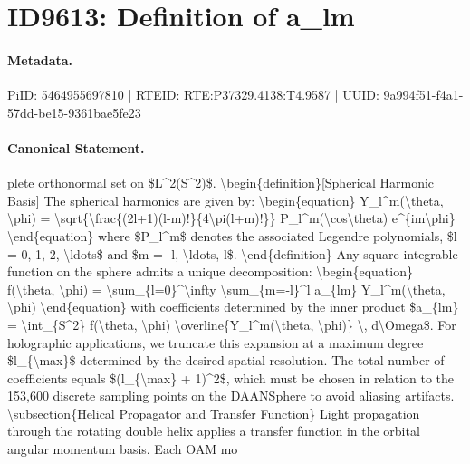 \section*{ID9613: Definition of a\_lm}
\paragraph{Metadata.}
PiID: 5464955697810 | RTEID: RTE:P37329.4138:T4.9587 | UUID: 9a994f51-f4a1-57dd-be15-9361bae5fe23

\paragraph{Canonical Statement.}
plete orthonormal set on \$L\textasciicircum{}2(S\textasciicircum{}2)\$. \textbackslash{}begin\{definition\}[Spherical Harmonic Basis] The spherical harmonics are given by: \textbackslash{}begin\{equation\} Y\_l\textasciicircum{}m(\textbackslash{}theta, \textbackslash{}phi) = \textbackslash{}sqrt\{\textbackslash{}frac\{(2l+1)(l-m)!\}\{4\textbackslash{}pi(l+m)!\}\} P\_l\textasciicircum{}m(\textbackslash{}cos\textbackslash{}theta) e\textasciicircum{}\{im\textbackslash{}phi\} \textbackslash{}end\{equation\} where \$P\_l\textasciicircum{}m\$ denotes the associated Legendre polynomials, \$l = 0, 1, 2, \textbackslash{}ldots\$ and \$m = -l, \textbackslash{}ldots, l\$. \textbackslash{}end\{definition\} Any square-integrable function on the sphere admits a unique decomposition: \textbackslash{}begin\{equation\} f(\textbackslash{}theta, \textbackslash{}phi) = \textbackslash{}sum\_\{l=0\}\textasciicircum{}\textbackslash{}infty \textbackslash{}sum\_\{m=-l\}\textasciicircum{}l a\_\{lm\} Y\_l\textasciicircum{}m(\textbackslash{}theta, \textbackslash{}phi) \textbackslash{}end\{equation\} with coefficients determined by the inner product \$a\_\{lm\} = \textbackslash{}int\_\{S\textasciicircum{}2\} f(\textbackslash{}theta, \textbackslash{}phi) \textbackslash{}overline\{Y\_l\textasciicircum{}m(\textbackslash{}theta, \textbackslash{}phi)\} \textbackslash{}, d\textbackslash{}Omega\$. For holographic applications, we truncate this expansion at a maximum degree \$l\_\{\textbackslash{}max\}\$ determined by the desired spatial resolution. The total number of coefficients equals \$(l\_\{\textbackslash{}max\} + 1)\textasciicircum{}2\$, which must be chosen in relation to the 153,600 discrete sampling points on the DAANSphere to avoid aliasing artifacts. \textbackslash{}subsection\{Helical Propagator and Transfer Function\} Light propagation through the rotating double helix applies a transfer function in the orbital angular momentum basis. Each OAM mo

